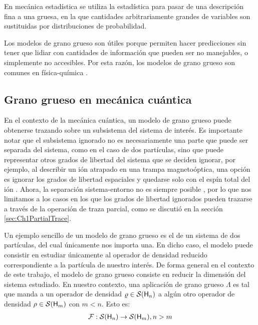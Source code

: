 En mecánica estadística se utiliza la estadística para pasar de una descripción fina a una gruesa, en la que cantidades arbitrariamente grandes de variables son sustituidas por distribuciones de probabilidad.

Los modelos de grano grueso son útiles porque permiten hacer predicciones sin tener que lidiar con cantidades de información que pueden ser no manejables, o simplemente no accesibles. Por esta razón, los modelos de grano grueso son comunes en física-química \cite{PhysChemI,PhysChemII,PhysChemIII} .


\subsection{Grano grueso en mecánica cuántica}


En el contexto de la mecánica cuántica, un modelo de grano grueso puede obtenerse trazando sobre un subsistema del sistema de interés. Es importante notar que el subsistema ignorado no es necesariamente una parte que puede ser separada del sistema, como en el caso de dos partículas, sino que puede representar otros grados de libertad del sistema que se deciden ignorar, por ejemplo, al describir un ión atrapado en una trampa magnetoóptica, una opción es ignorar los grados de libertad espaciales y quedarse solo con el espín total del ión \cite{Fox}. Ahora, la separación sistema-entorno no es siempre posible \cite{Macro-To-Micro}, por lo que nos limitamos a los casos en los que los grados de libertad ignorados pueden trazarse a través de la operación de traza parcial, como se discutió en la sección \ref{sec:Ch1PartialTrace}.

Un ejemplo sencillo de un modelo de grano grueso es el de un sistema de dos partículas, del cual únicamente nos importa una. En dicho caso, el modelo puede consistir en estudiar únicamente al operador de densidad reducido correspondiente a la partícula de nuestro interés. De forma general en el contexto de este trabajo, el modelo de grano grueso consiste en reducir la dimensión del sistema estudiado. En nuestro contexto, una aplicación de grano grueso $\Lambda$ es tal que manda a un operador de densidad $\varrho\in\mathcal{S}({\sf H}_{n})$ a algún otro operador de densidad $\rho\in\mathcal{S}({\sf H}_{m})$ con $m<n$. Esto es:
\begin{align}
    \mathcal{F}:\mathcal{S}({\sf H}_{n})\to \mathcal{S}({\sf H}_{m}), n>m\nonumber
\end{align}